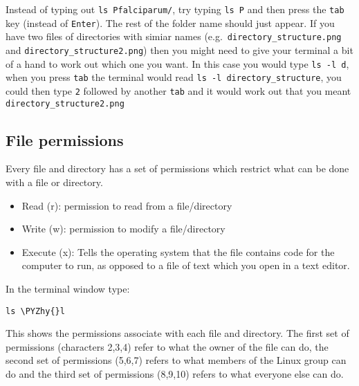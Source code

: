 \documentclass[11pt]{article}
\makeatletter
\providecommand{\tightlist}{%
      \setlength{\itemsep}{0pt}\setlength{\parskip}{0pt}}
\def\PYZhy{\char`\-}
\newcommand{\boxspacing}{\kern\kvtcb@left@rule\kern\kvtcb@boxsep}
\newcommand{\prompt}[4]{
        {\ttfamily\llap{{\color{blue}\LARGE\faKeyboardO\hspace{3pt}#4}}\vspace{-\baselineskip}}
    }
\makeatother
\begin{document}
Instead of typing out \texttt{ls\ Pfalciparum/}, try typing
\texttt{ls\ P} and then press the \texttt{tab} key (instead of
\texttt{Enter}). The rest of the folder name should just appear. If you
have two files of directories with simiar names
(e.g.~\texttt{directory\_structure.png} and
\texttt{directory\_structure2.png}) then you might need to give your
terminal a bit of a hand to work out which one you want. In this case
you would type \texttt{ls\ -l\ d}, when you press \texttt{tab} the
terminal would read \texttt{ls\ -l\ directory\_structure}, you could
then type \texttt{2} followed by another \texttt{tab} and it would work
out that you meant \texttt{directory\_structure2.png}

    \hypertarget{file-permissions}{%
\subsection{File permissions}\label{file-permissions}}

Every file and directory has a set of permissions which restrict what
can be done with a file or directory.

\begin{itemize}
\tightlist
\item
  Read (r): permission to read from a file/directory
\item
  Write (w): permission to modify a file/directory
\item
  Execute (x): Tells the operating system that the file contains code
  for the computer to run, as opposed to a file of text which you open
  in a text editor.
\end{itemize}

In the terminal window type:

    \begin{tcolorbox}[breakable, size=fbox, boxrule=1pt, pad at break*=1mm,colback=cellbackground, colframe=cellborder]
\prompt{In}{incolor}{ }{\boxspacing}
\begin{Verbatim}[commandchars=\\\{\}]
ls \PYZhy{}l
\end{Verbatim}
\end{tcolorbox}

    This shows the permissions associate with each file and directory. The
first set of permissions (characters 2,3,4) refer to what the owner of
the file can do, the second set of permissions (5,6,7) refers to what
members of the Linux group can do and the third set of permissions
(8,9,10) refers to what everyone else can do.
\end{document}
